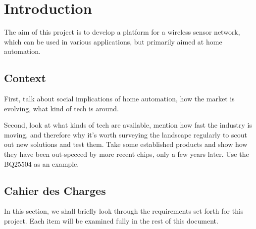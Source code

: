 \chapter{Introduction}\label{ch:introduction}

The aim of this project is to develop a platform for a wireless sensor network,
which can be used in various applications, but primarily aimed at home
automation. 

\section{Context}\label{sec:context}

First, talk about social implications of home automation, how the market is
evolving, what kind of tech is around.

Second, look at what kinds of tech are available, mention how fast the industry
is moving, and therefore why it's worth surveying the landscape regularly to
scout out new solutions and test them. Take some established products and show
how they have been out-specced by more recent chips, only a few years later. Use
the BQ25504 as an example.

\section{Cahier des Charges}\label{sec:cdc}

In this section, we shall briefly look through the requirements set forth for
this project. Each item will be examined fully in the rest of this document.

